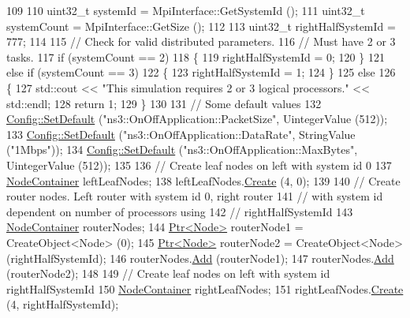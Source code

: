 \begin{DoxyCode}
109 
110   uint32\_t systemId = MpiInterface::GetSystemId ();
111   uint32\_t systemCount = MpiInterface::GetSize ();
112 
113   uint32\_t rightHalfSystemId = 777;
114 
115   \textcolor{comment}{// Check for valid distributed parameters.}
116   \textcolor{comment}{// Must have 2 or 3 tasks.}
117   \textcolor{keywordflow}{if} (systemCount == 2)
118     \{
119       rightHalfSystemId = 0;
120     \}
121   \textcolor{keywordflow}{else} \textcolor{keywordflow}{if} (systemCount == 3)
122     \{
123       rightHalfSystemId = 1;
124     \}
125   \textcolor{keywordflow}{else}
126     \{
127       std::cout << \textcolor{stringliteral}{"This simulation requires 2 or 3 logical processors."} << std::endl;
128       \textcolor{keywordflow}{return} 1;
129     \}
130     
131   \textcolor{comment}{// Some default values}
132   \hyperlink{group__config_ga2e7882df849d8ba4aaad31c934c40c06}{Config::SetDefault} (\textcolor{stringliteral}{"ns3::OnOffApplication::PacketSize"}, UintegerValue (512));
133   \hyperlink{group__config_ga2e7882df849d8ba4aaad31c934c40c06}{Config::SetDefault} (\textcolor{stringliteral}{"ns3::OnOffApplication::DataRate"}, StringValue (\textcolor{stringliteral}{"1Mbps"}));
134   \hyperlink{group__config_ga2e7882df849d8ba4aaad31c934c40c06}{Config::SetDefault} (\textcolor{stringliteral}{"ns3::OnOffApplication::MaxBytes"}, UintegerValue (512));
135 
136   \textcolor{comment}{// Create leaf nodes on left with system id 0}
137   \hyperlink{classns3_1_1NodeContainer}{NodeContainer} leftLeafNodes;
138   leftLeafNodes.\hyperlink{classns3_1_1NodeContainer_a787f059e2813e8b951cc6914d11dfe69}{Create} (4, 0);
139 
140   \textcolor{comment}{// Create router nodes.  Left router with system id 0, right router}
141   \textcolor{comment}{// with system id dependent on number of processors using}
142   \textcolor{comment}{// rightHalfSystemId}
143   \hyperlink{classns3_1_1NodeContainer}{NodeContainer} routerNodes;
144   \hyperlink{classns3_1_1Ptr}{Ptr<Node>} routerNode1 = CreateObject<Node> (0);
145   \hyperlink{classns3_1_1Ptr}{Ptr<Node>} routerNode2 = CreateObject<Node> (rightHalfSystemId);
146   routerNodes.\hyperlink{classns3_1_1NodeContainer_aa60b3a0e70f2fb324e16ffcf8bf31fcb}{Add} (routerNode1);
147   routerNodes.\hyperlink{classns3_1_1NodeContainer_aa60b3a0e70f2fb324e16ffcf8bf31fcb}{Add} (routerNode2);
148 
149   \textcolor{comment}{// Create leaf nodes on left with system id rightHalfSystemId}
150   \hyperlink{classns3_1_1NodeContainer}{NodeContainer} rightLeafNodes;
151   rightLeafNodes.\hyperlink{classns3_1_1NodeContainer_a787f059e2813e8b951cc6914d11dfe69}{Create} (4, rightHalfSystemId);

\end{DoxyCode}
